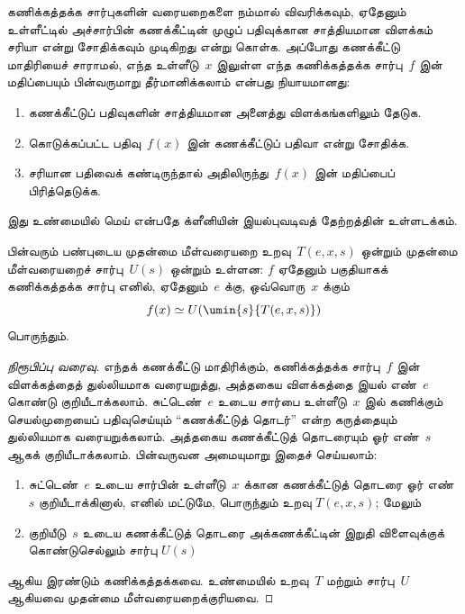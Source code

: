\documentclass[../../../include/open-logic-section]{subfiles}
\begin{document}


கணிக்கத்தக்க சார்புகளின் வரையறைகளை நம்மால் விவரிக்கவும், ஏதேனும்
உள்ளீட்டில் அச்சார்பின் கணக்கீட்டின் முழுப் பதிவுக்கான சாத்தியமான
விளக்கம் சரியா என்று சோதிக்கவும் முடிகிறது என்று கொள்க. அப்போது
கணக்கீட்டு மாதிரியைச் சாராமல், எந்த உள்ளீடு~$x$ இலுள்ள எந்த
கணிக்கத்தக்க சார்பு~$f$ இன் மதிப்பையும் பின்வருமாறு தீர்மானிக்கலாம்
என்பது நியாயமானது:
\begin{enumerate}
  \item கணக்கீட்டுப் பதிவுகளின் சாத்தியமான அனைத்து விளக்கங்களிலும்
  தேடுக.
  \item கொடுக்கப்பட்ட பதிவு~$f(x)$ இன் கணக்கீட்டுப் பதிவா என்று
  சோதிக்க.
  \item சரியான பதிவைக் கண்டிருந்தால் அதிலிருந்து~$f(x)$ இன்
  மதிப்பைப் பிரித்தெடுக்க.
\end{enumerate}
இது உண்மையில் மெய் என்பதே க்ளீனியின் இயல்புவடிவத் தேற்றத்தின்
உள்ளடக்கம்.

\begin{thm}[க்ளீனியின் இயல்புவடிவத் தேற்றம்]
பின்வரும் பண்புடைய முதன்மை மீள்வரையறை உறவு~$T(e, x, s)$ ஒன்றும்
முதன்மை மீள்வரையறைச் சார்பு~$U(s)$ ஒன்றும் உள்ளன: $f$ ஏதேனும்
பகுதியாகக் கணிக்கத்தக்க சார்பு எனில், ஏதேனும்~$e$ க்கு, ஒவ்வொரு~$x$
க்கும்
\[
f(x) \simeq U(\umin{s}{T(e, x, s)})
\]
பொருந்தும்.
\end{thm}

\begin{proof}[நிரூபிப்பு வரைவு]
எந்தக் கணக்கீட்டு மாதிரிக்கும், கணிக்கத்தக்க சார்பு~$f$ இன் விளக்கத்தைத்
துல்லியமாக வரையறுத்து, அத்தகைய விளக்கத்தை இயல் எண்~$e$ கொண்டு
குறியீடாக்கலாம். சுட்டெண்~$e$ உடைய சார்பை உள்ளீடு~$x$ இல்
கணிக்கும் செயல்முறையைப் பதிவுசெய்யும் “கணக்கீட்டுத் தொடர்”
என்ற கருத்தையும் துல்லியமாக வரையறுக்கலாம். அத்தகைய கணக்கீட்டுத்
தொடரையும் ஓர் எண்~$s$ ஆகக் குறியீடாக்கலாம். பின்வருவன அமையுமாறு
இதைச் செய்யலாம்:
\begin{enumerate}
  \item சுட்டெண்~$e$ உடைய சார்பின் உள்ளீடு~$x$ க்கான கணக்கீட்டுத்
  தொடரை ஓர் எண்~$s$ குறியீடாக்கினால், எனில் மட்டுமே, பொருந்தும்
  உறவு $T(e, x, s)$; மேலும்
  \item குறியீடு~$s$ உடைய கணக்கீட்டுத் தொடரை அக்கணக்கீட்டின்
  இறுதி விளைவுக்குக் கொண்டுசெல்லும் சார்பு $U(s)$
\end{enumerate}
ஆகிய இரண்டும் கணிக்கத்தக்கவை. உண்மையில் உறவு~$T$ மற்றும்
சார்பு~$U$ ஆகியவை முதன்மை மீள்வரையறைக்குரியவை.
\end{proof}
\end{document}
